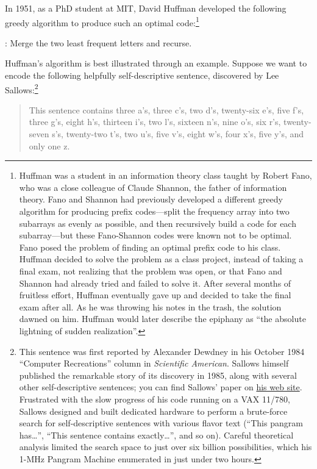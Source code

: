 In 1951, as a PhD student at MIT, David Huffman developed the following greedy algorithm to produce such an optimal code:\footnote{Huffman was a student in an information theory class taught by Robert Fano, who was a close colleague of Claude Shannon, the father of information theory. Fano and Shannon had previously developed a different greedy algorithm for producing prefix codes---split the frequency array into two subarrays as evenly as possible, and then recursively build a code for each subarray---but these Fano-Shannon codes were known not to be optimal. Fano posed the problem of finding an optimal prefix code to his class. Huffman decided to solve the problem as a class project, instead of taking a final exam, not realizing that the problem was open, or that Fano and Shannon had already tried and failed to solve it. After several months of fruitless effort, Huffman eventually gave up and decided to take the final exam after all. As he was throwing his notes in the trash, the solution dawned on him. Huffman would later describe the epiphany as “the absolute lightning of sudden realization”.}
\begin{problembox}
: Merge the two least frequent letters and recurse.
\end{problembox}
Huffman’s algorithm is best illustrated through an example.
Suppose we want to encode the following helpfully self-descriptive sentence, discovered by Lee Sallows:\footnote{This sentence was first reported by Alexander Dewdney in his October 1984 “Computer Recreations” column in \textsl{Scientific American}. Sallows himself published the remarkable story of its discovery in 1985, along with several other self-descriptive sentences; you can find Sallows’ paper on \href{http://www.leesallows.com/}{his web site}. Frustrated with the slow progress of his code running on a VAX 11/780, Sallows designed and built dedicated hardware to perform a brute-force search for self-descriptive sentences with various flavor text (“This pangram has\dots{}”, “This sentence contains exactly\dots{}”, and so on). Careful theoretical analysis limited the search space to just over six billion possibilities, which his 1-MHz Pangram Machine enumerated in just under two hours.}
\begin{quote}
\sffamily\small
This sentence contains three a’s, three c’s, two d’s, twenty-six e’s, five f’s, three g’s, eight h’s, thirteen i’s, two l’s, sixteen n’s, nine o’s, six r’s, twenty-seven s’s, twenty-two t’s, two u’s, five v’s, eight w’s, four x’s, five y’s, and only one z.
\end{quote}
